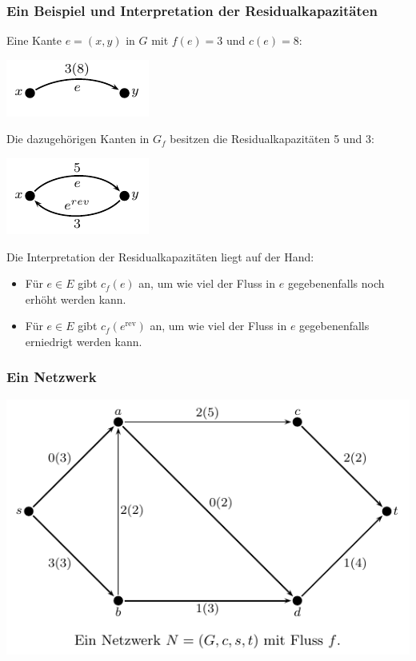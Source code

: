 \documentclass[smaller]{beamer}
\begin{document}
\begin{frame}
 \frametitle{Ein Beispiel und Interpretation der Residualkapazitäten}
 Eine Kante $e=(x,y)$ in $G$ mit $f(e)=3$ und $c(e)=8$:

\begin{center}
\includegraphics{fig66.pdf}
\end{center}

Die dazugehörigen Kanten in $G_f$ besitzen die \alert{Residualkapazitäten 5 und 3:}

\begin{center}
\includegraphics{fig67.pdf}
\end{center}
Die \alert{Interpretation der Residualkapazitäten} liegt auf der Hand:
\begin{itemize}
	\item Für $e \in E$ gibt $c_f(e)$ an, um wie viel der Fluss in $e$ gegebenenfalls noch erhöht werden kann.
	\item Für $e \in E$ gibt $c_f(e^\text{rev})$ an, um wie viel der Fluss in $e$ gegebenenfalls erniedrigt werden kann.
\end{itemize}

\end{frame}

\begin{frame}
 \frametitle{Ein Netzwerk}
 \begin{center}
  \includegraphics{fig68.pdf}
 \end{center}
\end{frame}
\end{document}
